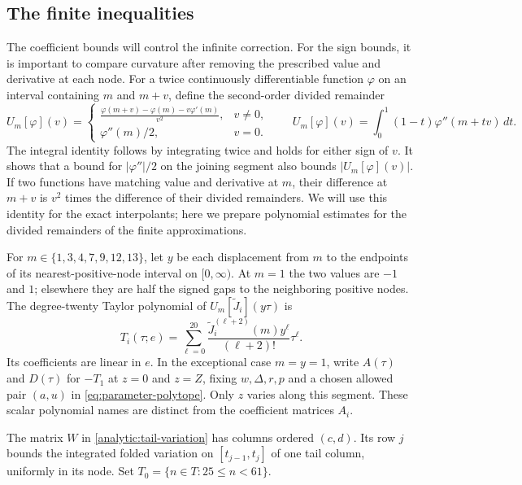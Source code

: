 \documentclass[11pt]{article}
\theoremstyle{remark}\newtheorem{remark}[theorem]{Remark}
\begin{document}
\subsection{The finite inequalities}

The coefficient bounds will control the infinite correction. For the
sign bounds, it is important to compare curvature after removing the
prescribed value and derivative at each node. For a twice continuously
differentiable function $\varphi$ on an interval containing $m$ and
$m+v$, define the second-order divided remainder
\begin{equation}\label{eq:deleted-jet}
 U_m[\varphi](v)=
 \begin{cases}
 \displaystyle\frac{\varphi(m+v)-\varphi(m)-v\varphi'(m)}{v^2},&v\ne0,\\[5pt]
 \varphi''(m)/2,&v=0.
 \end{cases}
 \qquad
 U_m[\varphi](v)=\int_0^1(1-t)\varphi''(m+tv)\,dt.
\end{equation}
The integral identity follows by integrating twice and holds for either
sign of $v$. It shows that a bound for $|\varphi''|/2$ on the joining
segment also bounds $|U_m[\varphi](v)|$. If two functions have matching
value and derivative at $m$, their difference at $m+v$ is $v^2$ times
the difference of their divided remainders. We will use this identity
for the exact interpolants; here we prepare polynomial estimates for
the divided remainders of the finite approximations.

For $m\in\{1,3,4,7,9,12,13\}$, let $y$ be each displacement from
$m$ to the endpoints of its nearest-positive-node interval on
$[0,\infty)$. At $m=1$ the two values are $-1$ and $1$; elsewhere
they are half the signed gaps to the neighboring positive nodes.
The degree-twenty Taylor polynomial of
$U_m[\widetilde J_i](y\tau)$ is
\begin{equation}
 T_i(\tau;e)=\sum_{\ell=0}^{20}
   \frac{\widetilde J_i^{(\ell+2)}(m)y^\ell}{(\ell+2)!}\tau^\ell.
 \label{eq:finite-taylor-polynomial}
\end{equation}
Its coefficients are linear in $e$. In the exceptional case $m=y=1$,
write $A(\tau)$ and $D(\tau)$ for $-T_1$ at $z=0$ and $z=Z$, fixing
$w,\Delta,r,p$ and a chosen allowed pair $(a,u)$ in
\eqref{eq:parameter-polytope}. Only $z$ varies along this segment.
These scalar polynomial names are distinct from the coefficient matrices
$A_i$.

The matrix $W$ in \eqref{analytic:tail-variation} has columns
ordered $(c,d)$. Its row $j$ bounds the integrated folded variation
on $[t_{j-1},t_j]$ of one tail column, uniformly in its node.
Set $T_0=\{n\in T:25\le n<61\}$.
\end{document}
